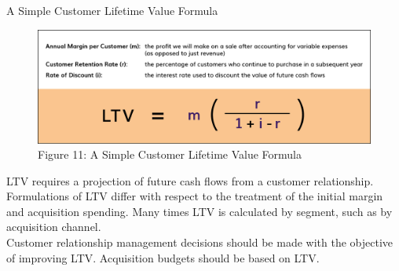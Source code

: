 \documentclass[pdf]{beamer}
\theoremstyle{remark}
\theoremstyle{definition}
\begin{document}
\begin{frame}[t]{A Simple Customer Lifetime Value Formula}
\begin{figure}[htbp]
    \centering
    \captionsetup{justification=centering}
    \includegraphics[clip, trim=0.0cm 0.0cm 0.0cm 0.0cm, width=1\textwidth]{Images/Figure_12_4.png}  
    \caption{Figure {\color{franklinblue} 11}: A Simple Customer Lifetime Value Formula}
    \label{fig:camplc}
\end{figure} 
\vspace{-2.0ex}
\small
LTV requires a projection of future cash flows from a customer relationship. Formulations of LTV differ with respect to the treatment of the initial margin and acquisition spending. Many times LTV is calculated by segment, such as by acquisition channel. \\
\vspace{1.5ex}
Customer relationship management decisions should be made with the objective of improving LTV. Acquisition budgets should be based on LTV.  
\end{frame}
\end{document}
